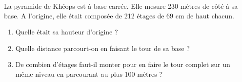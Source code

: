 
La pyramide de Khéops est à base carrée. Elle mesure 230 mètres de côté à sa base. A l'origine, elle était composée de 212 étages de 69 cm de haut chacun.
\begin{enumerate}
\item Quelle était sa hauteur d'origine ?
\item Quelle distance parcourt-on en faisant le tour de sa base ?
\item De combien d'étages faut-il monter pour en faire le tour complet sur un même niveau en parcourant au plus 100 mètres ?
\end{enumerate}